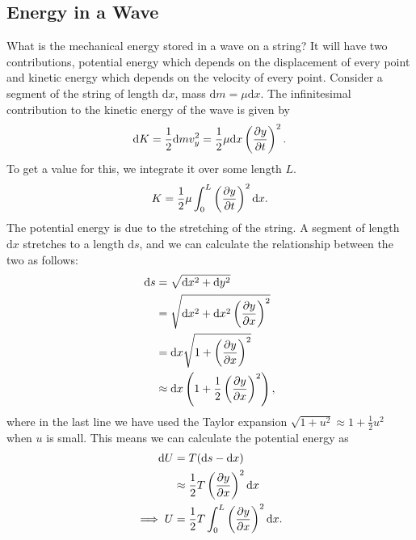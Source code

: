 \documentclass[../classical_mechanics.tex]{subfiles}
\begin{document}
        \subsection{Energy in a Wave}\label{subsec:energy-in-a-wave}
            What is the mechanical energy stored in a wave on a string?
            It will have two contributions, potential energy which depends on the displacement of every point and kinetic energy which depends on the velocity of every point.
            Consider a segment of the string of length $\mathrm{d}x$, mass $\mathrm{d}m=\mu\mathrm{d}x$.
            The infinitesimal contribution to the kinetic energy of the wave is given by
            \begin{equation}
                \mathrm{d}K=\frac{1}{2}\mathrm{d}mv_y^2=\frac{1}{2}\mu\mathrm{d}x\left(\pdv{y}{t}\right)^2.
            \end{equation}
            To get a value for this, we integrate it over some length $L$.
            \begin{equation}
                K=\frac{1}{2}\mu\int_{0}^{L}\left(\pdv{y}{t}\right)^2\mathrm{d}x.
            \end{equation}
            The potential energy is due to the stretching of the string.
            A segment of length $\mathrm{d}x$ stretches to a length $\mathrm{d}s$, and we can calculate the relationship between the two as follows:
            \begin{align}
                \mathrm{d}s&=\sqrt{\mathrm{d}x^2+\mathrm{d}y^2}\\
                &=\sqrt{\mathrm{d}x^2+\mathrm{d}x^2\left(\pdv{y}{x}\right)^2}\\
                &=\mathrm{d}x\sqrt{1+\left(\pdv{y}{x}\right)^2}\\
                &\approx\mathrm{d}x\left(1+\frac{1}{2}\left(\pdv{y}{x}\right)^2\right),
            \end{align}
            where in the last line we have used the Taylor expansion $\sqrt{1+u^2}\approx 1+\frac{1}{2}u^2$ when $u$ is small.
            This means we can calculate the potential energy as
            \begin{align}
                \mathrm{d}U&=T(\mathrm{d}s-\mathrm{d}x)\\
                &\approx\frac{1}{2}T\left(\pdv{y}{x}\right)^2\mathrm{d}x\\
                \implies U&=\frac{1}{2}T\int_{0}^{L}\left(\pdv{y}{x}\right)^2\mathrm{d}x.
            \end{align}
\end{document}
